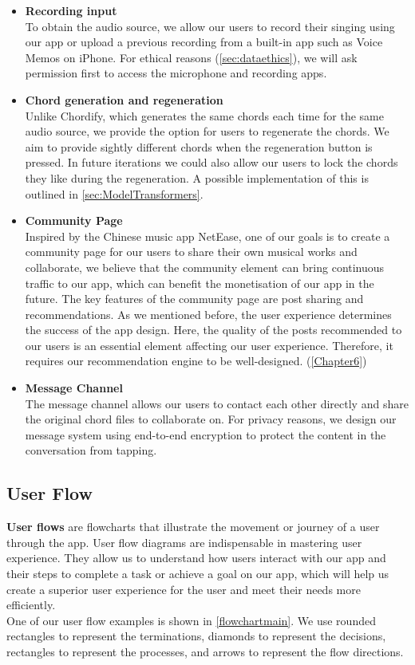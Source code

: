 \begin{itemize}
\item \textbf{Recording input}
\\ To obtain the audio source, we allow our users to record their singing using our app or upload a previous recording 
from a built-in app such as Voice Memos on iPhone. For ethical reasons (\cref{sec:dataethics}), we will ask permission first to access the microphone and recording apps.

\item \textbf{Chord generation and regeneration}
\\Unlike Chordify, which generates the same chords each time for the same audio source, we provide the option for users to regenerate the chords. We aim to provide sightly different chords when the regeneration button is pressed. 
In future iterations we could also allow our users to lock the chords they like during the regeneration. A possible implementation of this is outlined in \cref{sec:ModelTransformers}.

\item \textbf{Community Page}
\\Inspired by the Chinese music app NetEase, one of our goals is to create a community page for our users to share their own musical works and collaborate, 
we believe that the community element can bring continuous traffic to our app, which can benefit the monetisation of our app in the future. The key features of the community page are post sharing and recommendations.
As we mentioned before, the user experience determines the success of the app design. Here, the quality of the posts recommended to our users is an essential element affecting our user experience. 
Therefore, it requires our recommendation engine to be well-designed. (\cref{Chapter6})

\item \textbf{Message Channel}
\\The message channel allows our users to contact each other directly and share the original chord files to collaborate on. For privacy reasons, we design our message system using end-to-end encryption to protect the content in the conversation from tapping.

\end{itemize}

\subsection{User Flow}
 \textbf{User flows} are flowcharts that illustrate the movement or journey of a user through the app. User flow diagrams are indispensable in mastering user experience. 
 They allow us to understand how users interact with our app and their steps to complete a task or achieve a goal on our app, 
 which will help us create a superior user experience for the user and meet their needs more efficiently. 
 \\One of our user flow examples is shown in \cref{flowchartmain}.
 We use rounded rectangles to represent the terminations, diamonds to represent the decisions, rectangles to represent the processes, and arrows to represent the flow directions.


